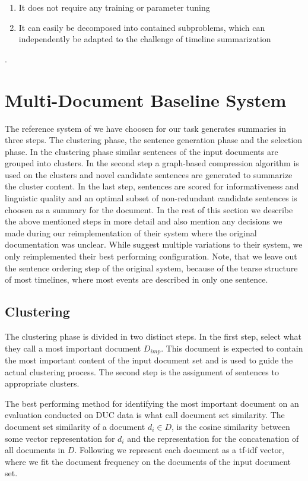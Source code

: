\documentclass[a4paper,BCOR=10mm]{report}
\begin{document}
\begin{enumerate}
\item{It does not require any training or parameter tuning}
\item{It can easily be decomposed into contained subproblems, which can independently be adapted to the challenge of timeline summarization}
\end{enumerate}.


\section{Multi-Document Baseline System} \label{sec:mds-baseline}

The reference system of \citet{banerjee} we have choosen for our task generates summaries in three steps. The clustering phase, the sentence generation phase and the selection phase. In the clustering phase similar sentences of the input documents are grouped into clusters. In the second step a graph-based compression algorithm is used on the clusters and novel candidate sentences are generated to summarize the cluster content. In the last step, sentences are scored for informativeness and linguistic quality and an optimal subset of non-redundant candidate sentences is choosen as a summary for the document. In the rest of this section we describe the above mentioned steps in more detail and also mention any decisions we made during our reimplementation of their system where the original documentation was unclear.
While \citeauthor{banerjee} suggest multiple variations to their system, we only reimplemented their best performing configuration. Note, that we leave out the sentence ordering step of the original system, because of the tearse structure of most timelines, where most events are described in only one sentence.

\subsection{Clustering}

The clustering phase is divided in two distinct steps. In the first step, \citeauthor{banerjee} select what they call a most important document $D_{imp}$. This document is expected to contain the most important content of the input document set and is used to guide the actual clustering process. The second step is the assignment of sentences to appropriate clusters.

The best performing method for identifying the most important document on an evaluation conducted on DUC data is what \citeauthor{banerjee} call document set similarity.
The document set similarity of a document $d_i \in D$, is the cosine similarity between some vector representation for $d_i$ and the representation for the concatenation of all documents in $D$.
Following \citeauthor{banerjee} we represent each document as a tf-idf vector, where we fit the document frequency on the documents of the input document set.
\end{document}
